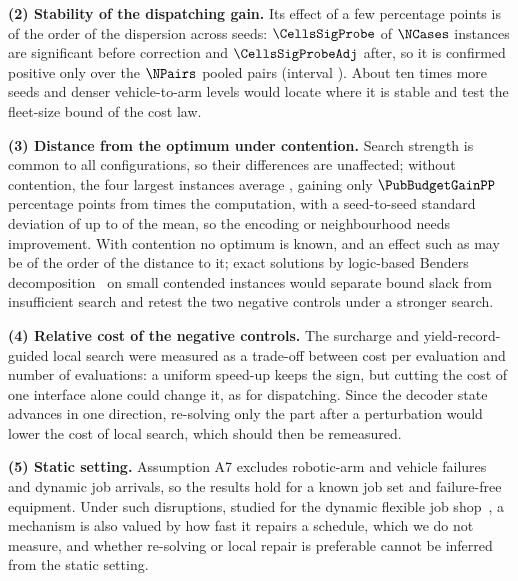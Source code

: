 \textbf{(2) Stability of the dispatching gain.}
Its effect of a few percentage points is of the order of the dispersion across seeds: $\CellsSigProbe$ of $\NCases$ instances are significant before correction and $\CellsSigProbeAdj$ after, so it is confirmed positive only over the $\NPairs$ pooled pairs (interval \CIProbeLoop{}). About ten times more seeds and denser vehicle-to-arm levels would locate where it is stable and test the fleet-size bound of the cost law.

\textbf{(3) Distance from the optimum under contention.}
Search strength is common to all configurations, so their differences are unaffected; without contention, the four largest instances average \PubGapBig{}, gaining only $\PubBudgetGainPP$ percentage points from \PubBudgetRatio{} times the computation, with a seed-to-seed standard deviation of up to \PubCvBig{} of the mean, so the encoding or neighbourhood needs improvement. With contention no optimum is known, and an effect such as \GainProbeLoop{} may be of the order of the distance to it; exact solutions by logic-based Benders decomposition~\cite{vanos2026exact} on small contended instances would separate bound slack from insufficient search and retest the two negative controls under a stronger search.

\textbf{(4) Relative cost of the negative controls.}
The surcharge and yield-record-guided local search were measured as a trade-off between cost per evaluation and number of evaluations: a uniform speed-up keeps the sign, but cutting the cost of one interface alone could change it, as for dispatching. Since the decoder state advances in one direction, re-solving only the part after a perturbation would lower the cost of local search, which should then be remeasured.

\textbf{(5) Static setting.}
Assumption A7 excludes robotic-arm and vehicle failures and dynamic job arrivals, so the results hold for a known job set and failure-free equipment. Under such disruptions, studied for the dynamic flexible job shop~\cite{gui2023dynamic,xiong2024dynamic,dauzereperes2024fjsp}, a mechanism is also valued by how fast it repairs a schedule, which we do not measure, and whether re-solving or local repair is preferable cannot be inferred from the static setting.









\endinput
